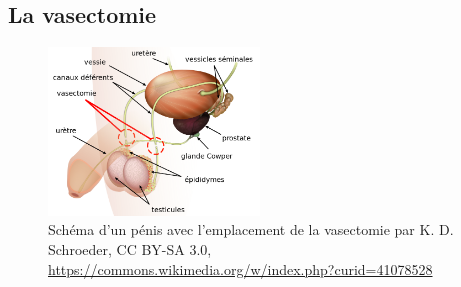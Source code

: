 \documentclass[12pt,a4paper]{report}
\begin{document}
\subsection{La vasectomie}

\begin{figure}[h]
    \centering
    \includegraphics[width=0.5\textwidth]{images/scientiphique/Vasectomie_fr.svg.png}
    \caption{Schéma d'un pénis avec l'emplacement de la vasectomie par K. D. Schroeder, CC BY-SA 3.0, \href{https://commons.wikimedia.org/w/index.php?curid=41078528}{https://commons.wikimedia.org/w/index.php?curid=41078528}}
    \label{fig:vasectomie}
\end{figure}
\end{document}
